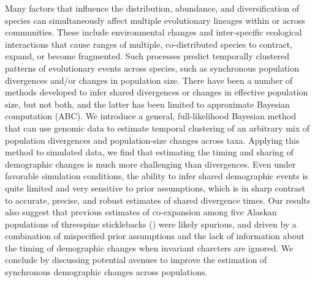 Many
factors that influence the distribution, abundance, and
diversification of species can simultaneously affect multiple evolutionary
lineages within or across communities.
These include environmental changes and inter-specific ecological interactions
that cause ranges of multiple, co-distributed species to contract,
expand, or become fragmented.
Such processes predict temporally clustered patterns of evolutionary events
across species, such as synchronous population divergences and/or changes in
population size.
There have been a number of methods developed to infer shared divergences or
changes in effective population size, but not both, and the latter has been
limited to approximate Bayesian computation (ABC).
We introduce a general, full-likelihood Bayesian method that can use genomic
data to estimate temporal clustering of an arbitrary mix of population
divergences and population-size changes across taxa.
Applying this method to simulated data,
we find that estimating the timing and sharing of demographic changes is much
more challenging than divergences.
Even under favorable simulation conditions, the ability to infer shared
demographic events is quite limited and very sensitive to prior assumptions,
which is in sharp contrast to accurate, precise, and robust estimates of shared
divergence times.
Our results also suggest that previous estimates of co-expansion among five
Alaskan populations of threespine sticklebacks ()
were likely spurious, and driven by a combination of mispecified prior
assumptions and the lack of information about the timing of demographic changes
when invariant charcters are ignored.
We conclude by discussing potential avenues to improve the estimation of
synchronous demographic changes across populations.
